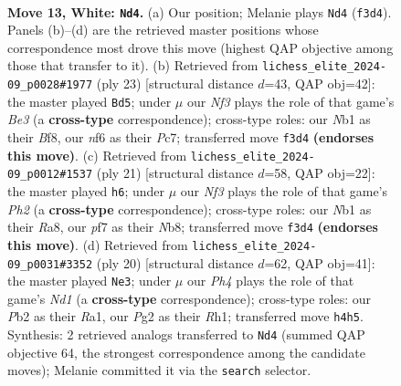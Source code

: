 \documentclass[11pt]{article}
\begin{document}
\clearpage

\begin{figure}[p]\centering
\begin{subfigure}{0.46\textwidth}\centering
\resizebox{\linewidth}{!}{%
\newchessgame
\chessboard[
  setfen={rnb1r3/1pk2ppp/4pn2/p7/Pb5P/1B2PN2/1P1B1PP1/RN3RK1 w - - 3 13},
  showmover=false,
  pgfstyle=straightmove, color=movearrow, markmove={f3-d4}
]}
\caption{}
\end{subfigure}\hfill
\begin{subfigure}{0.46\textwidth}\centering
\resizebox{\linewidth}{!}{%
\newchessgame
\chessboard[
  setfen={2kr1b1r/ppp1p1pp/4bnn1/8/4N3/2P3B1/PPB2PPP/R1K3NR b - - 8 12},
  showmover=false,
  pgfstyle=straightmove, color=movearrow, markmove={e6-d5}
]}
\caption{}
\end{subfigure}
\\[4pt]
\begin{subfigure}{0.46\textwidth}\centering
\resizebox{\linewidth}{!}{%
\newchessgame
\chessboard[
  setfen={rn2kb1r/1p3ppp/p1b2n2/4p3/8/2N3P1/PPN1PPBP/R1B2RK1 b kq - 5 11},
  showmover=false,
  pgfstyle=straightmove, color=movearrow, markmove={h7-h6}
]}
\caption{}
\end{subfigure}\hfill
\begin{subfigure}{0.46\textwidth}\centering
\resizebox{\linewidth}{!}{%
\newchessgame
\chessboard[
  setfen={r1b1k2r/1pp1n1pp/p2b1p2/2p5/4PB2/8/PPP1NPPP/R2NK2R w KQkq - 3 11},
  showmover=false,
  pgfstyle=straightmove, color=movearrow, markmove={d1-e3}
]}
\caption{}
\end{subfigure}
\caption{\textbf{Move 13, White: \texttt{Nd4}.} (a) Our position; Melanie plays \texttt{Nd4} (\texttt{f3d4}). Panels (b)--(d) are the retrieved master positions whose correspondence most drove this move (highest QAP objective among those that transfer to it). (b) Retrieved from \texttt{lichess\_elite\_2024-09\_p0028\#1977} (ply 23) [structural distance $d$=43, QAP obj=42]: the master played \texttt{Bd5}; under $\mu$ our \emph{Nf3} plays the role of that game's \emph{Be3} (a \textbf{cross-type} correspondence); cross-type roles: our \emph{N}b1 as their \emph{B}f8, our \emph{n}f6 as their \emph{P}c7; transferred move \texttt{f3d4} \textbf{(endorses this move)}. (c) Retrieved from \texttt{lichess\_elite\_2024-09\_p0012\#1537} (ply 21) [structural distance $d$=58, QAP obj=22]: the master played \texttt{h6}; under $\mu$ our \emph{Nf3} plays the role of that game's \emph{Ph2} (a \textbf{cross-type} correspondence); cross-type roles: our \emph{N}b1 as their \emph{R}a8, our \emph{p}f7 as their \emph{N}b8; transferred move \texttt{f3d4} \textbf{(endorses this move)}. (d) Retrieved from \texttt{lichess\_elite\_2024-09\_p0031\#3352} (ply 20) [structural distance $d$=62, QAP obj=41]: the master played \texttt{Ne3}; under $\mu$ our \emph{Ph4} plays the role of that game's \emph{Nd1} (a \textbf{cross-type} correspondence); cross-type roles: our \emph{P}b2 as their \emph{R}a1, our \emph{P}g2 as their \emph{R}h1; transferred move \texttt{h4h5}. Synthesis: 2 retrieved analogs transferred to \texttt{Nd4} (summed QAP objective 64, the strongest correspondence among the candidate moves); Melanie committed it via the \texttt{search} selector.}
\label{fig:thought-m24}
\end{figure}
\end{document}
